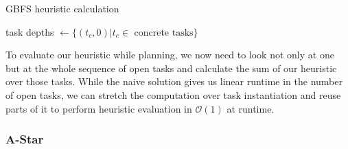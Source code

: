 \begin{comment}
- inspired by PandaGBFS
- GBFS:
	- use a heuristic to grade each node
	- next node: best of all neighbors of the current node
	- then do a DFS on this
- GBFS is not complete
- might get stuck in an infinite loop
\todo{Quote to describe GBFS?}

The heuristic:
- use a heuristic that is cheap in both preprocessing and in computation during each step
- determine the minimum number of actions/ reductions needed to solve the task network
- ignore any and all parameters and world state to simplify the computation
\todo{ensure the code actually does this!}
- iterative approach:
	- initial:
		- actions have remaining depth 0
		- reductions without children/ where all children are noops have depth 1
	- iterating:
		- reductions: the sum of the minimum depths of all subtasks + 1
		- tasks: the minimum over all reductions
- i.e., we heuristically try to find nodes with the minimum amount of work remaining
- each iteration gives us the remaining depth of at least 1 compound task, else we terminate
- i.e., efficient to compute
- tasks that do not receive a value are unresolvable and can be pruned
\end{comment}
\begin{algorithm}
	\caption{GBFS heuristic calculation}
	\label{algo: gbfs heuristic}
	task depths $\gets \{(t_c, 0) | t_c \in \text{ concrete tasks}\}$\;
\end{algorithm}
To evaluate our heuristic while planning, we now need to look not only at one but at the whole sequence of open tasks and calculate the sum of our heuristic over those tasks. While the naive solution gives us linear runtime in the number of open tasks, we can stretch the computation over task instantiation and reuse parts of it to perform heuristic evaluation in $\mathcal{O}(1)$ at runtime.
\cite{refer to implementation chapter - we build up the sum as we instantiate new search nodes}

\subsubsection{A-Star}


